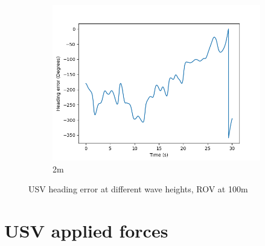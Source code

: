 \documentclass[class=article, crop=false]{standalone}
\begin{document}
\begin{figure}
\begin{subfigure}[b]{0.48\textwidth}
        \includegraphics{scenario1/rov-100m/2.0m/usv_heading_error_controlled}
        \caption{2m}
        \label{}
    \end{subfigure}

    \caption{USV heading error at different wave heights, ROV at 100m}
\end{figure}

\section{USV applied forces}
\end{document}
